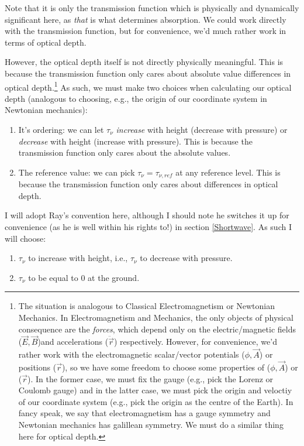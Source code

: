 Note that it is only the transmission function which is physically and dynamically significant here, as \textit{that} is what determines absorption. We could work directly with the transmission function, but for convenience, we'd much rather work in terms of optical depth.

However, the optical depth itself is not directly physically meaningful. This is because the transmission function only cares about absolute value differences in optical depth.\footnote{
    The situation is analogous to Classical Electromagnetism or Newtonian Mechanics. In Electromagnetism and Mechanics, the only objects of physical consequence are the \textit{forces}, which depend only on the electric/magnetic fields ($\vec{E},\vec{B}$)\footnotemark and accelerations ($\ddot{\vec{r}}$) respectively. However, for convenience, we'd rather work with the electromagnetic scalar/vector potentials ($\phi,\vec{A}$) or  positions ($\vec{r}$), so we have some freedom to choose some properties of ($\phi,\vec{A}$) or ($\vec{r}$). In the former case, we must fix the gauge (e.g., pick the Lorenz or Coulomb gauge) and in the latter case, we must pick the origin and veloctiy of our coordinate system (e.g., pick the origin as the centre of the Earth). In fancy speak, we say that electromagnetism has a gauge symmetry and Newtonian mechanics has galillean symmetry. We must do a similar thing here for optical depth.
} As such, we must make two choices when calculating our optical depth (analogous to choosing, e.g., the origin of our coordinate system in Newtonian mechanics):
\begin{enumerate}
    \item It's ordering: we can let $\tau_\nu$ \textit{increase} with height (decrease with pressure) or \textit{decrease} with height (increase with pressure). This is because the transmission function only cares about the absolute values.
    \item The reference value: we can pick $\tau_\nu=\tau_{\nu,ref}$ at any reference level. This is because the transmission function only cares about differences in optical depth.
\end{enumerate}
I will adopt Ray's convention here, although I should note he switches it up for convenience (as he is well within his rights to!) in section \ref{Shortwave}. As such I will choose:
\begin{enumerate}
    \item $\tau_\nu$ to increase with height, i.e., $\tau_\nu$ to decrease with pressure.
    \item $\tau_\nu$ to be equal to $0$ at the ground.
\end{enumerate}

